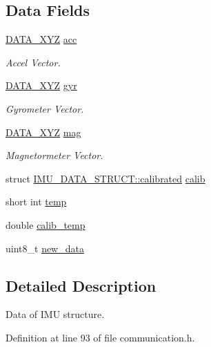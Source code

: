 \subsection*{Data Fields}
\begin{DoxyCompactItemize}
\item 
\hyperlink{structDATA__XYZ}{D\-A\-T\-A\-\_\-\-X\-Y\-Z} \hyperlink{structIMU__DATA__STRUCT_a448f284bf44eb503affda586ad5fa9d2}{acc}
\begin{DoxyCompactList}\small\item\em Accel Vector. \end{DoxyCompactList}\item 
\hyperlink{structDATA__XYZ}{D\-A\-T\-A\-\_\-\-X\-Y\-Z} \hyperlink{structIMU__DATA__STRUCT_a0c1ac26626e4434a2ee124a1928a23a1}{gyr}
\begin{DoxyCompactList}\small\item\em Gyrometer Vector. \end{DoxyCompactList}\item 
\hyperlink{structDATA__XYZ}{D\-A\-T\-A\-\_\-\-X\-Y\-Z} \hyperlink{structIMU__DATA__STRUCT_a40c7df8b6d49297aa52873cfd9b60daa}{mag}
\begin{DoxyCompactList}\small\item\em Magnetormeter Vector. \end{DoxyCompactList}\item 
struct \hyperlink{structIMU__DATA__STRUCT_1_1calibrated}{I\-M\-U\-\_\-\-D\-A\-T\-A\-\_\-\-S\-T\-R\-U\-C\-T\-::calibrated} \hyperlink{structIMU__DATA__STRUCT_aeffe3c3c5a7191a5cef16e7aab6c3795}{calib}
\item 
short int \hyperlink{structIMU__DATA__STRUCT_a81e1dbf765c1d947ca6076aa1bbc73e7}{temp}
\item 
double \hyperlink{structIMU__DATA__STRUCT_a3553fcee6beba17fe0c7711ac0483875}{calib\-\_\-temp}
\item 
uint8\-\_\-t \hyperlink{structIMU__DATA__STRUCT_a99924252176326418863e511d4fa437b}{new\-\_\-data}
\end{DoxyCompactItemize}


\subsection{Detailed Description}
Data of I\-M\-U structure. 

Definition at line 93 of file communication.\-h.




